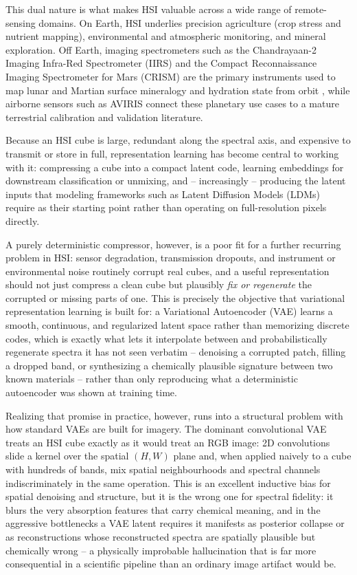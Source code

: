 \documentclass{article} %
\begin{document}
This dual nature is what makes HSI valuable across a wide range of remote-sensing domains. On Earth, HSI underlies precision agriculture (crop stress and nutrient mapping), environmental and atmospheric monitoring, and mineral exploration. Off Earth, imaging spectrometers such as the Chandrayaan-2 Imaging Infra-Red Spectrometer (IIRS) and the Compact Reconnaissance Imaging Spectrometer for Mars (CRISM) are the primary instruments used to map lunar and Martian surface mineralogy and hydration state from orbit \citep{chowdhury2020iirs, murchie2007crism}, while airborne sensors such as AVIRIS \citep{green1998aviris} connect these planetary use cases to a mature terrestrial calibration and validation literature.

Because an HSI cube is large, redundant along the spectral axis, and expensive to transmit or store in full, representation learning has become central to working with it: compressing a cube into a compact latent code, learning embeddings for downstream classification or unmixing, and -- increasingly -- producing the latent inputs that modeling frameworks such as Latent Diffusion Models (LDMs) require as their starting point rather than operating on full-resolution pixels directly.

A purely deterministic compressor, however, is a poor fit for a further recurring problem in HSI: sensor degradation, transmission dropouts, and instrument or environmental noise routinely corrupt real cubes, and a useful representation should not just compress a clean cube but plausibly \emph{fix or regenerate} the corrupted or missing parts of one. This is precisely the objective that variational representation learning is built for: a Variational Autoencoder (VAE) \citep{kingma2014vae} learns a smooth, continuous, and regularized latent space rather than memorizing discrete codes, which is exactly what lets it interpolate between and probabilistically regenerate spectra it has not seen verbatim -- denoising a corrupted patch, filling a dropped band, or synthesizing a chemically plausible signature between two known materials -- rather than only reproducing what a deterministic autoencoder was shown at training time.

Realizing that promise in practice, however, runs into a structural problem with how standard VAEs are built for imagery. The dominant convolutional VAE treats an HSI cube exactly as it would treat an RGB image: 2D convolutions slide a kernel over the spatial $(H, W)$ plane and, when applied naively to a cube with hundreds of bands, mix spatial neighbourhoods and spectral channels indiscriminately in the same operation. This is an excellent inductive bias for spatial denoising and structure, but it is the wrong one for spectral fidelity: it blurs the very absorption features that carry chemical meaning, and in the aggressive bottlenecks a VAE latent requires it manifests as posterior collapse or as reconstructions whose reconstructed spectra are spatially plausible but chemically wrong -- a physically improbable hallucination that is far more consequential in a scientific pipeline than an ordinary image artifact would be.
\end{document}
